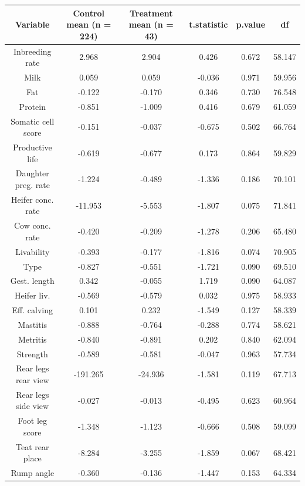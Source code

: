 \begin{table}[ht]
\centering
\begin{tabular}{cccccc}
  \hline
Variable & Control mean (n = 224) & Treatment mean (n = 43) & t.statistic & p.value & df \\ 
  \hline
Inbreeding rate & 2.968 & 2.904 & 0.426 & 0.672 & 58.147 \\ 
  Milk & 0.059 & 0.059 & -0.036 & 0.971 & 59.956 \\ 
  Fat & -0.122 & -0.170 & 0.346 & 0.730 & 76.548 \\ 
  Protein & -0.851 & -1.009 & 0.416 & 0.679 & 61.059 \\ 
  Somatic cell score & -0.151 & -0.037 & -0.675 & 0.502 & 66.764 \\ 
  Productive life & -0.619 & -0.677 & 0.173 & 0.864 & 59.829 \\ 
  Daughter preg. rate & -1.224 & -0.489 & -1.336 & 0.186 & 70.101 \\ 
  Heifer conc. rate & -11.953 & -5.553 & -1.807 & 0.075 & 71.841 \\ 
  Cow conc. rate & -0.420 & -0.209 & -1.278 & 0.206 & 65.480 \\ 
  Livability & -0.393 & -0.177 & -1.816 & 0.074 & 70.905 \\ 
  Type & -0.827 & -0.551 & -1.721 & 0.090 & 69.510 \\ 
  Gest. length & 0.342 & -0.055 & 1.719 & 0.090 & 64.087 \\ 
  Heifer liv. & -0.569 & -0.579 & 0.032 & 0.975 & 58.933 \\ 
  Eff. calving & 0.101 & 0.232 & -1.549 & 0.127 & 58.339 \\ 
  Mastitis & -0.888 & -0.764 & -0.288 & 0.774 & 58.621 \\ 
  Metritis & -0.840 & -0.891 & 0.202 & 0.840 & 62.094 \\ 
  Strength & -0.589 & -0.581 & -0.047 & 0.963 & 57.734 \\ 
  Rear legs rear view & -191.265 & -24.936 & -1.581 & 0.119 & 67.713 \\ 
  Rear legs side view & -0.027 & -0.013 & -0.495 & 0.623 & 60.964 \\ 
  Foot leg score & -1.348 & -1.123 & -0.666 & 0.508 & 59.099 \\ 
  Teat rear place & -8.284 & -3.255 & -1.859 & 0.067 & 68.421 \\ 
  Rump angle & -0.360 & -0.136 & -1.447 & 0.153 & 64.334 \\ 

\end{tabular}
\end{table}
